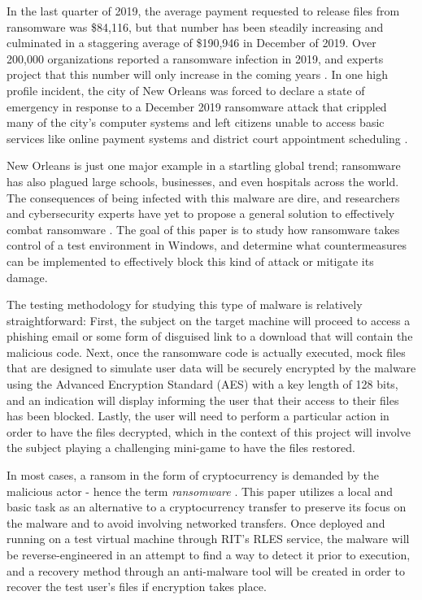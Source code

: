 \documentclass[sigconf]{acmart}
\begin{document}
    In the last quarter of 2019, the average payment requested to release files from ransomware was \$84,116, but that number has been steadily increasing and culminated in a staggering average of \$190,946 in December of 2019. Over 200,000 organizations reported a ransomware infection in 2019, and experts project that this number will only increase in the coming years \cite{popper_2020}. In one high profile incident, the city of New Orleans was forced to declare a state of emergency in response to a December 2019 ransomware attack that crippled many of the city's computer systems and left citizens unable to access basic services like online payment systems and district court appointment scheduling \cite{Winder_2019}. 
    
    New Orleans is just one major example in a startling global trend; ransomware has also plagued large schools, businesses, and even hospitals across the world. The consequences of being infected with this malware are dire, and researchers and cybersecurity experts have yet to propose a general solution to effectively combat ransomware \cite{Norton_2018}. The goal of this paper is to study how ransomware takes control of a test environment in Windows, and determine what countermeasures can be implemented to effectively block this kind of attack or mitigate its damage.
    
    The testing methodology for studying this type of malware is relatively straightforward: First, the subject on the target machine will proceed to access a phishing email or some form of disguised link to a download that will contain the malicious code. Next, once the ransomware code is actually executed, mock files that are designed to simulate user data will be securely encrypted by the malware using the Advanced Encryption Standard (AES) with a key length of 128 bits, and an indication will display informing the user that their access to their files has been blocked. Lastly, the user will need to perform a particular action in order to have the files decrypted, which in the context of this project will involve the subject playing a challenging mini-game to have the files restored. 
    
    In most cases, a ransom in the form of cryptocurrency is demanded by the malicious actor - hence the term \emph{ransomware} \cite{Ransomware_background}. This paper utilizes a local and basic task as an alternative to a cryptocurrency transfer to preserve its focus on the malware and to avoid involving networked transfers. Once deployed and running on a test virtual machine through RIT's RLES service, the malware will be reverse-engineered in an attempt to find a way to detect it prior to execution, and a recovery method through an anti-malware tool will be created in order to recover the test user's files if encryption takes place.
    
\end{document}
